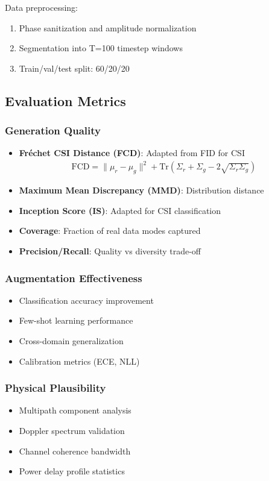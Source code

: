 \documentclass[journal]{IEEEtran}
\begin{document}
Data preprocessing:
\begin{enumerate}
\item Phase sanitization and amplitude normalization
\item Segmentation into T=100 timestep windows
\item Train/val/test split: 60/20/20
\end{enumerate}

\subsection{Evaluation Metrics}

\subsubsection{Generation Quality}
\begin{itemize}
\item \textbf{Fréchet CSI Distance (FCD)}: Adapted from FID for CSI
\begin{align}
\text{FCD} = \|\mu_r - \mu_g\|^2 + \text{Tr}(\Sigma_r + \Sigma_g - 2\sqrt{\Sigma_r\Sigma_g})
\end{align}
\item \textbf{Maximum Mean Discrepancy (MMD)}: Distribution distance
\item \textbf{Inception Score (IS)}: Adapted for CSI classification
\item \textbf{Coverage}: Fraction of real data modes captured
\item \textbf{Precision/Recall}: Quality vs diversity trade-off
\end{itemize}

\subsubsection{Augmentation Effectiveness}
\begin{itemize}
\item Classification accuracy improvement
\item Few-shot learning performance
\item Cross-domain generalization
\item Calibration metrics (ECE, NLL)
\end{itemize}

\subsubsection{Physical Plausibility}
\begin{itemize}
\item Multipath component analysis
\item Doppler spectrum validation
\item Channel coherence bandwidth
\item Power delay profile statistics
\end{itemize}
\end{document}
